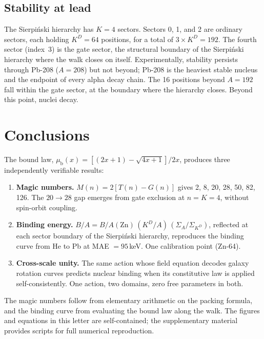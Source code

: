 \documentclass[fleqn,usenatbib]{mnras}
\begin{document}
\subsection{Stability at lead}

The Sierpi\'nski hierarchy has $K = 4$ sectors. Sectors 0, 1, and 2 are ordinary sectors, each holding $K^D = 64$ positions, for a total of $3 \times K^D = 192$. The fourth sector (index~3) is the gate sector, the structural boundary of the Sierpi\'nski hierarchy where the walk closes on itself. Experimentally, stability persists through Pb-208 ($A = 208$) but not beyond; Pb-208 is the heaviest stable nucleus and the endpoint of every alpha decay chain. The 16 positions beyond $A = 192$ fall within the gate sector, at the boundary where the hierarchy closes. Beyond this point, nuclei decay.

\section{Conclusions}
\label{sec:conclusions}

The bound law, $\mu_{\mathrm{b}}(x) = [(2x+1) - \sqrt{4x+1}]/2x$, produces three independently verifiable results:

\begin{enumerate}
\item \textbf{Magic numbers.} $M(n) = 2[T(n) - G(n)]$ gives 2, 8, 20, 28, 50, 82, 126. The $20\!\to\!28$ gap emerges from gate exclusion at $n = K = 4$, without spin-orbit coupling.
\item \textbf{Binding energy.} $B/A = B/A(\mathrm{Zn})\,(K^D/A)\,(\Sigma_A/\Sigma_{K^D})$, reflected at each sector boundary of the Sierpi\'nski hierarchy, reproduces the binding curve from He to Pb at MAE $= 95$\,keV. One calibration point (Zn-64).
\item \textbf{Cross-scale unity.} The same action whose field equation decodes galaxy rotation curves predicts nuclear binding when its constitutive law is applied self-consistently. One action, two domains, zero free parameters in both.
\end{enumerate}

The magic numbers follow from elementary arithmetic on the packing formula, and the binding curve from evaluating the bound law along the walk. The figures and equations in this letter are self-contained; the supplementary material provides scripts for full numerical reproduction.
\end{document}
